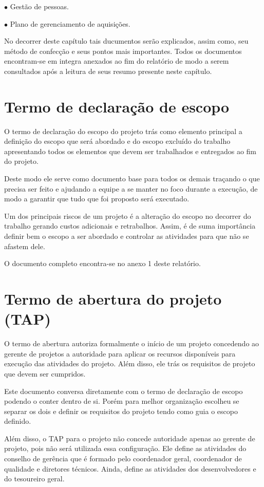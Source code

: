 			$\bullet$ Gestão de pessoas.
			
			$\bullet$ Plano de gerenciamento de aquisições.
		

No decorrer deste capítulo tais ducumentos serão explicados, assim como, seu método de confecção e seus pontos mais importantes. Todos os documentos encontram-se em integra anexados ao fim do relatório de modo a serem consultados após a leitura de seus resumo presente neste capítulo. 

\section{Termo de declaração de escopo}

O termo de declaração do escopo do projeto trás como elemento principal a definição do escopo que será abordado e do escopo excluído do trabalho apresentando todos os elementos que devem ser trabalhados e entregados ao fim do projeto.

Deste modo ele serve como documento base para todos os demais traçando o que precisa ser feito e ajudando a equipe a se manter no foco durante a execução, de modo a garantir que tudo que foi proposto será executado. 

Um dos principais riscos de um projeto é a alteração do escopo no decorrer do trabalho gerando custos adicionais e retrabalhos. Assim, é de suma importância definir bem o escopo a ser abordado e controlar as atividades para que não se afastem dele.

O documento completo encontra-se no anexo 1 deste relatório.

\section{Termo de abertura do projeto (TAP)}

O termo de abertura autoriza formalmente o início de um projeto concedendo ao gerente de projetos a autoridade para aplicar os recursos disponíveis para execução das atividades do projeto. Além disso, ele trás os requisitos de projeto que devem ser cumpridos. 

Este documento conversa diretamente com o termo de declaração de escopo podendo o conter dentro de si. Porém para melhor organização escolheu se separar os dois e definir os requisitos do projeto tendo como guia o escopo definido.

Além disso, o TAP para o projeto não concede autoridade apenas ao gerente de projeto, pois não será utilizada essa configuração. Ele define as atividades do conselho de gerência que é formado pelo coordenador geral, coordenador de qualidade e diretores técnicos. Ainda, define as atividades dos desenvolvedores e do tesoureiro geral. 

